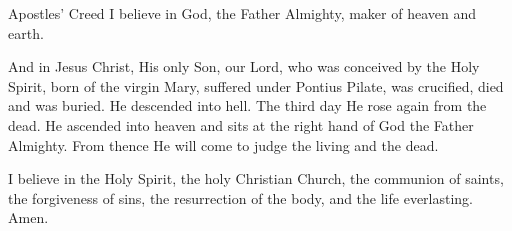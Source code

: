 Apostles' Creed
I believe in God, the Father Almighty, maker of heaven and earth. 
  
And in Jesus Christ, His only Son, our Lord, who was conceived by the Holy Spirit, born of the 
virgin Mary, suffered under Pontius Pilate, was crucified, died and was buried. He 
descended into hell. The third day He rose again from the dead. He ascended into heaven 
and sits at the right hand of God the Father Almighty. From thence He will come to judge 
the living and the dead. 
  
I believe in the Holy Spirit, the holy Christian Church, the communion of saints, the 
forgiveness of sins, the resurrection of the body, and the life everlasting. Amen. 
